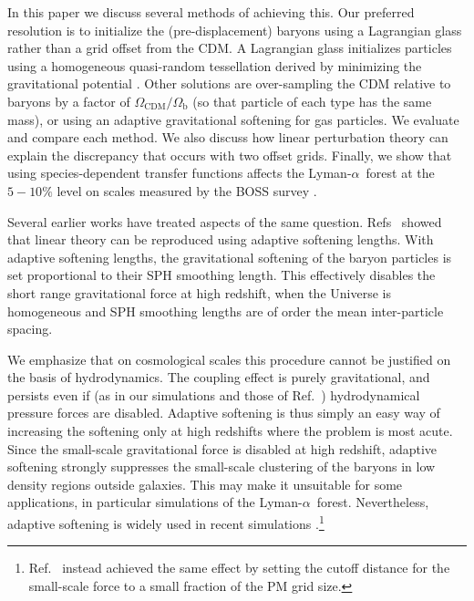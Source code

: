 \documentclass[a4paper,11pt]{article}
\newcommand{\Lya}{Lyman-$\alpha$}
\begin{document}
In this paper we discuss several methods of achieving this. Our preferred resolution is to initialize the (pre-displacement) baryons using a Lagrangian glass rather than a grid offset from the CDM. A Lagrangian glass initializes particles using a homogeneous quasi-random tessellation derived by minimizing the gravitational potential \cite{White:1994}. Other solutions are over-sampling the CDM relative to baryons by a factor of $\Omega_\mathrm{CDM}/\Omega_\mathrm{b}$ (so that particle of each type has the same mass), or using an adaptive gravitational softening for gas particles. We evaluate and compare each method. We also discuss how linear perturbation theory can explain the discrepancy that occurs with two offset grids. Finally, we show that using species-dependent transfer functions affects the \Lya~forest at the $5-10\%$ level on scales measured by the BOSS survey \cite{PD2013}.



Several earlier works have treated aspects of the same question. Refs~\cite{OLeary:2012, Angulo:2013} showed that linear theory can be reproduced using adaptive softening lengths. With adaptive softening lengths, the gravitational softening of the baryon particles is set proportional to their SPH smoothing length. This effectively disables the short range gravitational force at high redshift, when the Universe is homogeneous and SPH smoothing lengths are of order the mean inter-particle spacing.

We emphasize that on cosmological scales this procedure cannot be justified on the basis of hydrodynamics. The coupling effect is purely gravitational, and persists even if (as in our simulations and those of Ref.~\cite{Angulo:2013}) hydrodynamical pressure forces are disabled. Adaptive softening is thus simply an easy way of increasing the softening only at high redshifts where the problem is most acute. Since the small-scale gravitational force is disabled at high redshift, adaptive softening strongly suppresses the small-scale clustering of the baryons in low density regions outside galaxies. This may make it unsuitable for some applications, in particular simulations of the \Lya~forest. Nevertheless, adaptive softening is widely used in recent simulations \cite[e.g][]{Paco:2018}.\footnote{Ref.~\cite{Valkenburg:2017} instead achieved the same effect by setting the cutoff distance for the small-scale force to a small fraction of the PM grid size.}
\end{document}

